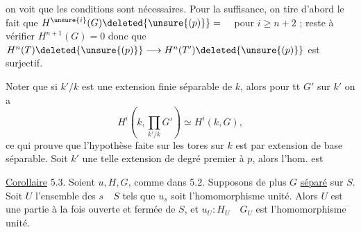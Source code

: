 on voit que les conditions sont nécessaires.
Pour la suffisance, on tire d'abord le fait
que $H^{\unsure{i}}(G)\deleted{\unsure{(p)}}=\quad$ pour $i\geq n+2$ ; reste
à vérifier $H^{n+1}(G)=0$ donc que
$H^n(T)\deleted{\unsure{(p)}}\longrightarrow H^n(T')\deleted{\unsure{(p)}}$ est surjectif.

Noter que si $k'/k$ est une extension finie
séparable de $k$, alors pour tt $G'$ sur $k'$
on a
\[
H^i(k,\prod_{k'/k}G')\simeq H^i(k,G),
\]
ce qui prouve que l'hypothèse faite sur
les tores sur $k$ est \uline{} par
extension de base séparable. Soit $k'$ une
telle extension de degré premier à $p$, alors
l'hom. 
est  



\uline{Corollaire} 5.3. Soient $u,H,G$, comme dans 5.2. Supposons de plus
$G$ \uline{séparé} sur $S$. Soit $U$ l'ensemble des $s\quad S$ tels que $u_s$ soit l'homomorphisme unité. Alors $U$ est une partie à la fois ouverte et fermée de $S$,
et $u_U:H_U\quad G_U$ est l'homomorphisme unité.

